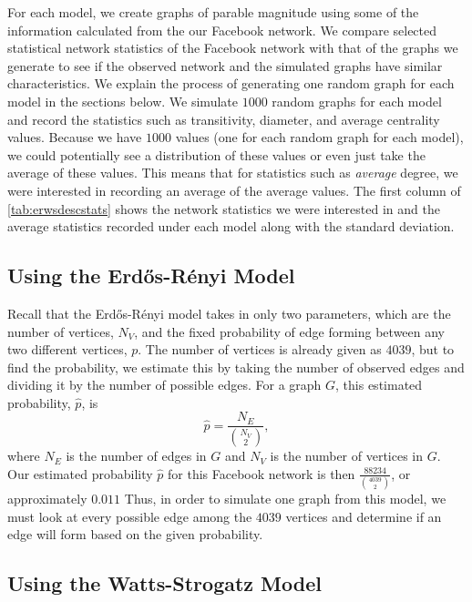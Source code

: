 \documentclass[12pt,twoside]{amherstthesis}
\begin{document}
  For each model, we create graphs of parable magnitude using some of the
  information calculated from the our Facebook network. We compare
  selected statistical network statistics of the Facebook network with
  that of the graphs we generate to see if the observed network and the
  simulated graphs have similar characteristics. We explain the process of
  generating one random graph for each model in the sections below. We
  simulate \(1000\) random graphs for each model and record the statistics
  such as transitivity, diameter, and average centrality values. Because
  we have \(1000\) values (one for each random graph for each model), we
  could potentially see a distribution of these values or even just take
  the average of these values. This means that for statistics such as
  \emph{average} degree, we were interested in recording an average of the
  average values. The first column of \autoref{tab:erwsdescstats} shows
  the network statistics we were interested in and the average statistics
  recorded under each model along with the standard deviation.
  
  \subsection{Using the Erdős-Rényi
  Model}\label{using-the-erdos-renyi-model}
  
  Recall that the Erdős-Rényi model takes in only two parameters, which
  are the number of vertices, \(N_{V}\), and the fixed probability of edge
  forming between any two different vertices, \(p\). The number of
  vertices is already given as \(4039\), but to find the probability, we
  estimate this by taking the number of observed edges and dividing it by
  the number of possible edges. For a graph \(G\), this estimated
  probability, \(\hat{p}\), is
  \[\hat{p} = \frac {N_{E}} {{N_{V} \choose 2}},\] where \(N_{E}\) is the
  number of edges in \(G\) and \(N_{V}\) is the number of vertices in
  \(G\). Our estimated probability \(\hat{p}\) for this Facebook network
  is then \(\frac {88234} {{4039 \choose 2}}\), or approximately \(0.011\)
  Thus, in order to simulate one graph from this model, we must look at
  every possible edge among the \(4039\) vertices and determine if an edge
  will form based on the given probability.
  
  \subsection{Using the Watts-Strogatz
  Model}\label{using-the-watts-strogatz-model}
  
\end{document}
